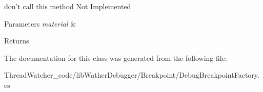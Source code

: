 don't call this method Not Implemented 


\begin{DoxyParams}{Parameters}
{\em material} & \\
\hline
\end{DoxyParams}
\begin{DoxyReturn}{Returns}

\end{DoxyReturn}


The documentation for this class was generated from the following file\+:\begin{DoxyCompactItemize}
\item 
Thread\+Watcher\+\_\+code/lib\+Wather\+Debugger/\+Breakpoint/Debug\+Breakpoint\+Factory.\+cs\end{DoxyCompactItemize}
